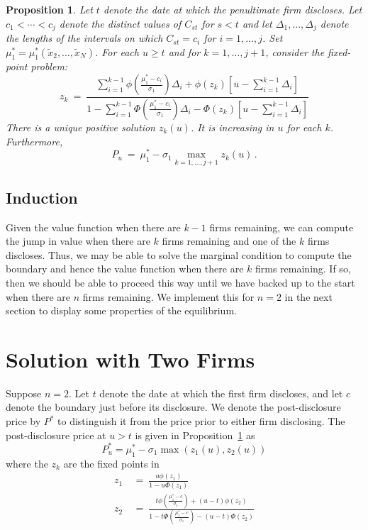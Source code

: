 \documentclass[authoryear,letterpaper,english,12pt]{elsarticle}
\theoremstyle{plain}
\newtheorem{proposition}{Proposition}
\numberwithin{lemma}{section}
\numberwithin{proposition}{section}
\numberwithin{equation}{section}
\numberwithin{figure}{section}
\begin{document}
\begin{proposition}\label{prop:last}
Let $t$ denote the date at which the penultimate firm discloses.  Let $c_1< \cdots < c_j$ denote the distinct values of $C_{st}$ for $s<t$ and let $\Delta_1,\ldots, \Delta_j$ denote the lengths of the intervals on which $C_{st}=c_i$ for $i=1,\ldots,j$.
Set $\mu^*_1 = \mu^*_1(\tilde x_2,\ldots,\tilde x_N)$.  For each $u\ge t$ and for $k=1,\ldots, j+1$, consider the fixed-point problem:
\begin{equation}
z_k \ = \ \frac{\sum_{i=1}^{k-1} \phi\left(\frac{\mu^*_1-c_i}{\sigma_{1}}\right)\Delta_i + \phi(z_k)\left[u- \sum_{i=1}^{k-1}\Delta_i\right]}
{1 - \sum_{i=1}^{k-1} \Phi\left(\frac{\mu^*_{1}-c_i}{\sigma_{1}}\right)\Delta_i - \Phi(z_k)\left[u- \sum_{i=1}^{k-1}\Delta_i\right]}
\end{equation} 
There is a unique positive solution $z_k(u)$.  It is increasing in $u$ for each $k$.  Furthermore, 
\begin{equation}
P_u  \ = \ \mu_1^* - \sigma_1 \max_{k=1,\ldots,j+1}z_k(u)\,.
\end{equation}
\end{proposition}

\subsection{Induction}

Given the value function when there are $k-1$ firms remaining, we can compute the jump in value when there are $k$ firms remaining and one of the $k$ firms discloses.  Thus, we may be able to solve the marginal condition to compute the boundary and hence the value function when there are $k$ firms remaining.  If so, then we should be able to proceed this way until we have backed up to the start when there are $n$ firms remaining.  We implement this for $n=2$ in the next section to display some properties of the equilibrium.  

\section{Solution with Two Firms}

Suppose $n=2$.  Let $t$ denote the date at which the first firm discloses, and let $c$ denote the boundary just before its disclosure.  We denote the post-disclosure price by $P^*$ to distinguish it from the price prior to either firm disclosing.  The post-disclosure price at $u>t$ is given in Proposition~\ref{prop:last} as
\begin{equation}\label{price:last}
    P^*_u = \mu_1^* - \sigma_1 \max(z_1(u), z_2(u))
\end{equation}
where the $z_k$ are the fixed points in
\begin{align}
z_1 \ &= \ \frac{u\phi(z_1)}{1 - u\Phi(z_1)}\\
z_2 \ &= \ \frac{ t\phi\left(\frac{\mu^*_1-c}{\sigma_{1}}\right)+ (u-t)\phi(z_2)}
{1 - t\Phi\left(\frac{\mu^*_{1}-c}{\sigma_{1}}\right) - (u-t)\Phi(z_2)}
\end{align}
\end{document}
